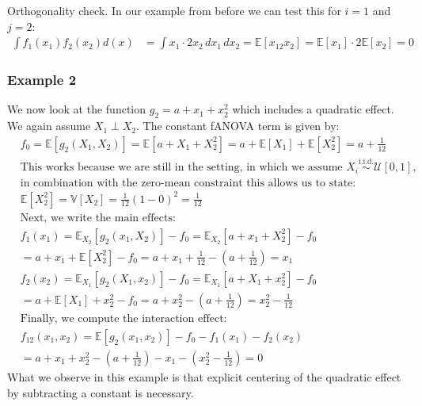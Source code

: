 Orthogonality check. In our example from before we can test this for $i = 1$ and $j = 2$:
\begin{align*}
    \int f_{1}(x_1) f_{2}(x_2) d(x) &= \int x_1 \cdot 2x_2 \, dx_1 \, dx_2 = \mathbb{E}[x_12x_2] = \mathbb{E}[x_1] \cdot 2\mathbb{E}[x_2] = 0
\end{align*}

\subsubsection*{Example 2}
We now look at the function $g_{2} = a + x_1 + x_{2}^2$ which includes a quadratic effect. We again assume $X_1 \perp X_2$. The constant fANOVA term is given by:
\begin{align*}
    &f_0 = \mathbb{E}[g_{2}(X_1, X_2)] = \mathbb{E}[a + X_1 + X_{2}^2] = a + \mathbb{E}[X_1] + \mathbb{E}[X_{2}^2] = a + \frac{1}{12} \\
    &\text{This works because we are still in the setting, in which we assume } X_i \overset{\text{i.i.d.}}{\sim} \mathcal{U}[0, 1], \\
    &\text{in combination with the zero-mean constraint this allows us to state:} \\
    &\mathbb{E}[X_2^2] = \mathbb{V}[X_2] = \frac{1}{12}(1 - 0)^2 = \frac{1}{12} \\
    &\text{Next, we write the main effects:} \\
    &f_1(x_1) = \mathbb{E}_{X_2}[g_{2}(x_1, X_2)] - f_0 = \mathbb{E}_{X_2}[a + x_1 + X_{2}^2] - f_0 \\
    &= a + x_1 + \mathbb{E}[X_{2}^2] - f_0 = a + x_1 + \frac{1}{12} - \left( a + \frac{1}{12} \right) = x_1 \\
    &f_2(x_2) = \mathbb{E}_{X_1}[g_{2}(X_1, x_2)] - f_0 = \mathbb{E}_{X_1}[a + X_1 + x_{2}^2] - f_0 \\
    &= a + \mathbb{E}[X_1] + x_{2}^2 - f_0 = a + x_{2}^2 - \left( a + \frac{1}{12} \right) = x_{2}^2 - \frac{1}{12} \\
    &\text{Finally, we compute the interaction effect:} \\
    &f_{12}(x_1, x_2) = \mathbb{E}[g_{2}(x_1, x_2)] - f_0 - f_1(x_1) - f_2(x_2) \\
    &= a + x_1 + x_{2}^2 - \left( a + \frac{1}{12} \right) - x_1 - \left( x_{2}^2 - \frac{1}{12} \right) = 0
\end{align*}
What we observe in this example is that explicit centering of the quadratic effect by subtracting a constant is necessary.

